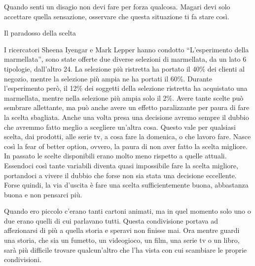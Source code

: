 \documentclass[12pt]{book} %
\begin{document}
Quando senti un disagio non devi fare per forza qualcosa. Magari devi solo accettare quella sensazione, osservare che
questa situazione ti fa stare così.


\bigskip
\begin{mdframed}[linewidth=1pt]
Il paradosso della scelta

I ricercatori Sheena Iyengar e Mark Lepper hanno condotto “L'esperimento della marmellata”, sono
state offerte due diverse selezioni di marmellata, da un lato 6 tipologie, dall'altro 24. La
selezione più ristretta ha portato il 40\% dei clienti al negozio, mentre la selezione più ampia ne ha portati il 60\%.
Durante l'esperimento però, il 12\% dei soggetti della selezione ristretta ha acquistato una
marmellata, mentre nella selezione più ampia solo il 2\%. Avere tante scelte può sembrare allettante, ma può anche
avere un effetto paralizzante per paura di fare la scelta sbagliata. Anche una volta presa una decisione avremo sempre
il dubbio che avremmo fatto meglio a scegliere un'altra cosa. Questo vale per qualsiasi scelta, dai prodotti, alle
serie tv, a cosa fare la domenica, o che lavoro fare. Nasce così la fear of better option, ovvero, la paura di non aver
fatto la scelta migliore. In passato le scelte disponibili erano molto meno rispetto a quelle attuali. Essendoci così
tante variabili diventa quasi impossibile fare la scelta migliore, portandoci a vivere il dubbio che forse non sia
stata una decisione eccellente. Forse quindi, la via d'uscita è fare una scelta sufficientemente
buona, abbastanza buona e non pensarci più.

Quando ero piccolo c'erano tanti cartoni animati, ma in quel momento solo uno o due erano quelli di cui parlavano tutti. Questa condivisione portava ad affezionarsi di più a quella storia e speravi non finisse mai. Ora mentre guardi una storia, che sia un fumetto, un videogioco, un film, una serie tv o un libro, sarà più difficile trovare qualcun'altro che l'ha vista con cui scambiare le proprie condivisioni.
\end{mdframed}
\end{document}

